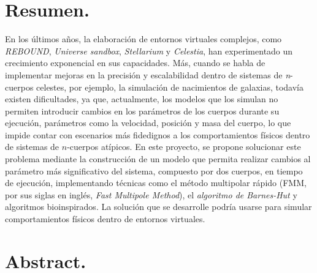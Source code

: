 \chapter{Resumen.}
\justifying
En los últimos años, la elaboración de entornos virtuales complejos, 
como \textit{REBOUND}, \textit{Universe sandbox}, \textit{Stellarium} y \textit{Celestia}, 
han experimentado un crecimiento exponencial en sus capacidades. Más, cuando se habla de 
implementar mejoras en la precisión y escalabilidad dentro de sistemas de \textit{n}-cuerpos celestes, 
por ejemplo, la simulación de nacimientos de galaxias, todavía existen dificultades, ya que, actualmente, 
los modelos que los simulan no permiten introducir cambios en los parámetros de los cuerpos durante su ejecución, 
parámetros como la velocidad, posición y masa del cuerpo, lo que impide contar con escenarios más fidedignos a los 
comportamientos  físicos dentro de sistemas de $n$-cuerpos atípicos. En este proyecto, se propone solucionar este 
problema mediante la construcción de un modelo que permita realizar cambios al parámetro más significativo del  sistema, 
compuesto por dos cuerpos, en tiempo de ejecución, implementando técnicas como el método multipolar rápido (FMM, por sus siglas en inglés, 
\textit{Fast Multipole Method}), el \textit{algoritmo de Barnes-Hut} y algoritmos bioinspirados. La solución que se desarrolle podría usarse 
para simular comportamientos físicos dentro de entornos virtuales.\\

\chapter{Abstract.}
\lipsum[1-3]
